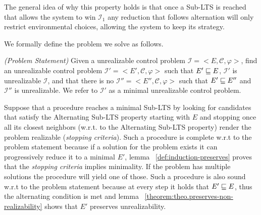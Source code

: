 The general idea of why this property holds is that once a Sub-LTS is reached that allows the system to win $\mathcal{I}_1$ any reduction that follows alternation will only restrict environmental choices, allowing the system to keep its strategy.


We formally define the problem we solve as follows.

\begin{definition}\label{def:ProblemStatement}\emph{(Problem Statement)}
Given a unrealizable control problem $\mathcal{I} = <E, \mathcal{C}, \varphi>$, find an unrealizable control problem $\mathcal{I'} = <E', \mathcal{C}, \varphi>$ such that $E' \sqsubseteq E$, $\mathcal{I'}$ is unrealizable $\mathcal{I}$, and that there is no $\mathcal{I''} = <E'', \mathcal{C}, \varphi>$ such that $E' \sqsubseteq E''$ and $\mathcal{I''}$ is unrealizable. We refer to $\mathcal{I'}$ as a minimal unrealizable control problem.
\end{definition}

Suppose that a procedure reaches a minimal Sub-LTS by looking for candidates that satisfy the Alternating Sub-LTS property starting with $E$ and stopping once all its closest neighbors (w.r.t. to the Alternating Sub-LTS property) render the problem realizable (\emph{stopping criteria}). Such a procedure is 
complete w.r.t to the problem statement because
if a solution for the problem exists it can progressively
reduce it to a minimal $E'$, lemma ~\ref{def:induction-preserves} proves that the \emph{stopping criteria}
implies minimality. If the problem has multiple solutions the procedure
will yield one of those.
Such a procedure is also sound w.r.t to the problem statement because
at every step it holds that $E' \sqsubseteq E$, thus the alternating condition
is met and lemma ~\ref{theorem:theo.preserves-non-realizability} shows that
$E'$ preserves unrealizability.
%
